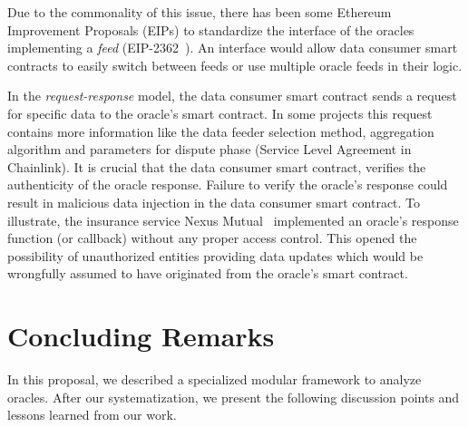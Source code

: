 Due to the commonality of this issue, there has been some Ethereum Improvement Proposals (EIPs) to standardize the interface of the oracles implementing a \textit{feed} (\eg EIP-2362~\cite{eip2362}). An interface would allow data consumer smart contracts to easily switch between feeds or use multiple oracle feeds in their logic. 

In the \textit{request-response} model, the data consumer smart contract sends a request for specific data to the oracle's smart contract. In some projects this request contains more information like the data feeder selection method, aggregation algorithm and parameters for dispute phase (\eg Service Level Agreement in Chainlink). It is crucial that the data consumer smart contract, verifies the authenticity of the oracle response. Failure to verify the oracle's response could result in malicious data injection in the data consumer smart contract. To illustrate, the insurance service Nexus Mutual~\cite{nexusmutualbug} implemented an oracle's response function (or callback) without any proper access control. This opened the possibility of unauthorized entities providing data updates which would be wrongfully assumed to have originated from the oracle's smart contract. 



\section{Concluding Remarks}
In this proposal, we described a specialized modular framework to analyze oracles. After our systematization, we present the following discussion points and lessons learned from our work. 

